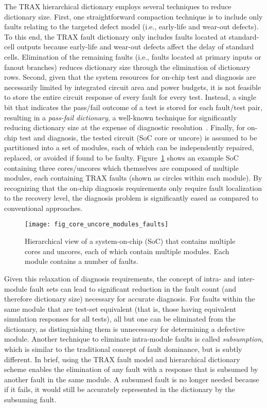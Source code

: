 The TRAX hierarchical dictionary employs several techniques to reduce dictionary size.
%
First, one straightforward compaction technique is to include only faults relating to the targeted defect model (i.e., early-life and wear-out defects).
%
To this end, the TRAX fault dictionary only includes faults located at standard-cell outputs because early-life and wear-out defects affect the delay of standard cells.
%
Elimination of the remaining faults (i.e., faults located at primary inputs or fanout branches) reduces dictionary size through the elimination of dictionary rows.
%
Second, given that the system resources for on-chip test and diagnosis are necessarily limited by integrated circuit area and power budgets, it is not feasible to store the entire circuit response of every fault for every test.
%
Instead, a single bit that indicates the pass/fail outcome of a test is stored for each fault/test pair, resulting in a \textit{pass-fail dictionary}, a well-known technique for significantly reducing dictionary size at the expense of diagnostic resolution~\cite{pomeranz92}.
%
Finally, for on-chip test and diagnosis, the tested circuit (SoC core or uncore) is assumed to be partitioned into a set of modules, each of which can be independently repaired, replaced, or avoided if found to be faulty.
%
Figure~\ref{fig:intro_core_uncore_modules_faults} shows an example SoC containing three cores/uncores which themselves are composed of multiple modules, each containing TRAX faults (shown as circles within each module).
%
By recognizing that the on-chip diagnosis requirements only require fault localization to the recovery level, the diagnosis problem is significantly eased as compared to conventional approaches.

\begin{figure}[hbtp]
\centering
\texttt{[image: fig\_core\_uncore\_modules\_faults]}
\caption{Hierarchical view of a system-on-chip (SoC) that contains multiple cores and uncores, each of which contain multiple modules.
%
Each module contains a number of faults.}
\label{fig:intro_core_uncore_modules_faults}
\end{figure}

Given this relaxation of diagnosis requirements, the concept of intra- and inter-module fault sets can lead to significant reduction in the fault count (and therefore dictionary size) necessary for accurate diagnosis.
%
For faults within the same module that are test-set equivalent (that is, those having equivalent simulation responses for all tests), all but one can be eliminated from the dictionary, as distinguishing them is unnecessary for determining a defective module.
%
Another technique to eliminate intra-module faults is called \textit{subsumption}, which is similar to the traditional concept of fault dominance, but is subtly different.
%
In brief, using the TRAX fault model and hierarchical dictionary scheme enables the elimination of any fault with a response that is subsumed by another fault in the same module.
%
A subsumed fault is no longer needed because if it fails, it would still be accurately represented in the dictionary by the subsuming fault.

